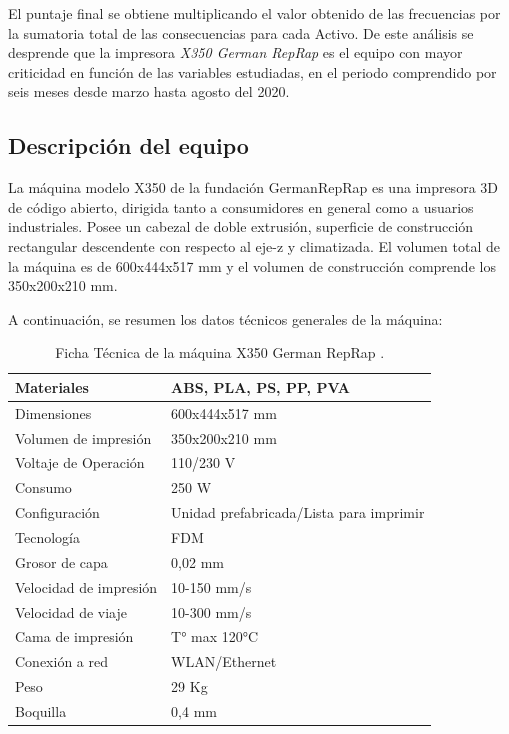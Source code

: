 El puntaje final se obtiene multiplicando el valor obtenido de las frecuencias por la sumatoria total de las consecuencias para cada Activo. De este análisis se desprende que la impresora \textit{X350 German RepRap} es el equipo con mayor criticidad en función de las variables estudiadas, en el periodo comprendido por seis meses desde marzo hasta agosto del 2020.

\subsection{Descripción del equipo}

La máquina modelo X350 de la fundación GermanRepRap es una impresora 3D de código abierto, dirigida tanto a consumidores en general como a usuarios industriales. Posee un cabezal de doble extrusión, superficie de construcción rectangular descendente con respecto al eje-z y  climatizada. El volumen total de la máquina es de 600x444x517 mm y el volumen de construcción comprende los 350x200x210 mm.

A continuación, se resumen los datos técnicos generales de la máquina: 

\begin{table}[H]
  \centering
  
    \begin{tabular}{|l|l|}
    \hline
    Materiales & ABS, PLA, PS, PP, PVA \\
    \hline
    Dimensiones & 600x444x517 mm \\
    \hline
    Volumen de impresión & 350x200x210 mm \\
    \hline
    Voltaje de Operación & 110/230 V \\
    \hline
    Consumo & 250 W \\
    \hline
    Configuración  & Unidad prefabricada/Lista para imprimir \\
    \hline
    Tecnología & FDM \\
    \hline
    Grosor de capa & 0,02 mm \\
    \hline
    Velocidad de impresión  & 10-150 mm/s \\
    \hline
    Velocidad de viaje & 10-300 mm/s \\
    \hline
    Cama de impresión & T° max 120°C \\
    \hline
    Conexión a red & WLAN/Ethernet \\
    \hline
    Peso  & 29 Kg \\
    \hline
    Boquilla & 0,4 mm \\
    \hline
    \end{tabular}%
    \caption{Ficha Técnica de la máquina X350 German RepRap \citep{germanreprap2019}.}
  \label{tab:addlabel}%
\end{table}%



